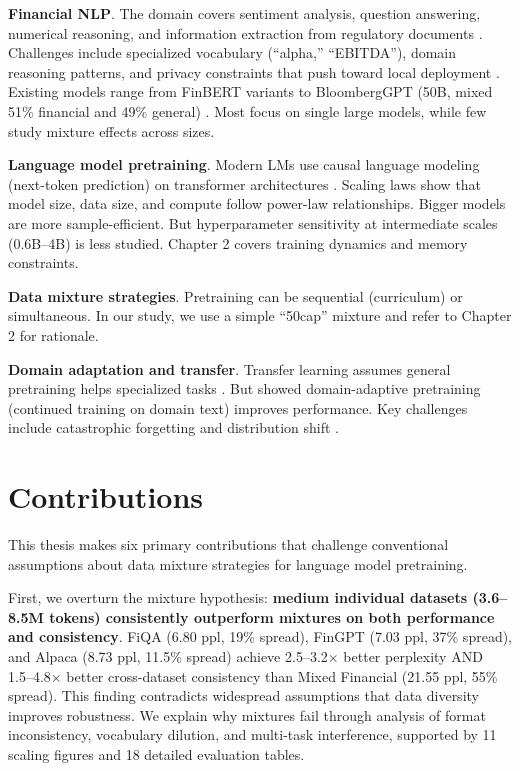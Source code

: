 \textbf{Financial NLP}. The domain covers sentiment analysis, question answering, numerical reasoning, and information extraction from regulatory documents \parencite{araci2019finbert, chen2021finqa}. Challenges include specialized vocabulary (``alpha,'' ``EBITDA''), domain reasoning patterns, and privacy constraints that push toward local deployment \parencite{wu2023bloomberggpt}. Existing models range from FinBERT variants \parencite{araci2019finbert, yang2020finbert} to BloombergGPT (50B, mixed 51\% financial and 49\% general) \parencite{wu2023bloomberggpt}. Most focus on single large models, while few study mixture effects across sizes.

\textbf{Language model pretraining}. Modern LMs use causal language modeling (next-token prediction) on transformer architectures \parencite{vaswani2017attention, radford2019language, brown2020language}. Scaling laws \parencite{kaplan2020scaling, hoffmann2022training} show that model size, data size, and compute follow power-law relationships. Bigger models are more sample-efficient. But hyperparameter sensitivity at intermediate scales (0.6B–4B) is less studied. Chapter 2 covers training dynamics and memory constraints.

\textbf{Data mixture strategies}. Pretraining can be sequential (curriculum) or simultaneous. In our study, we use a simple “50cap” mixture and refer to Chapter 2 for rationale.

\textbf{Domain adaptation and transfer}. Transfer learning assumes general pretraining helps specialized tasks \parencite{devlin2019bert, pan2010transfer}. But \textcite{gururangan2020don} showed domain-adaptive pretraining (continued training on domain text) improves performance. Key challenges include catastrophic forgetting \parencite{kirkpatrick2017overcoming} and distribution shift \parencite{quinonero2009dataset}. 

\section{Contributions}

This thesis makes six primary contributions that challenge conventional assumptions about data mixture strategies for language model pretraining.

First, we overturn the mixture hypothesis: \textbf{medium individual datasets (3.6–8.5M tokens) consistently outperform mixtures on both performance and consistency}. FiQA (6.80 ppl, 19\% spread), FinGPT (7.03 ppl, 37\% spread), and Alpaca (8.73 ppl, 11.5\% spread) achieve 2.5–3.2$\times$ better perplexity AND 1.5–4.8$\times$ better cross-dataset consistency than Mixed Financial (21.55 ppl, 55\% spread). This finding contradicts widespread assumptions that data diversity improves robustness. We explain why mixtures fail through analysis of format inconsistency, vocabulary dilution, and multi-task interference, supported by 11 scaling figures and 18 detailed evaluation tables.

